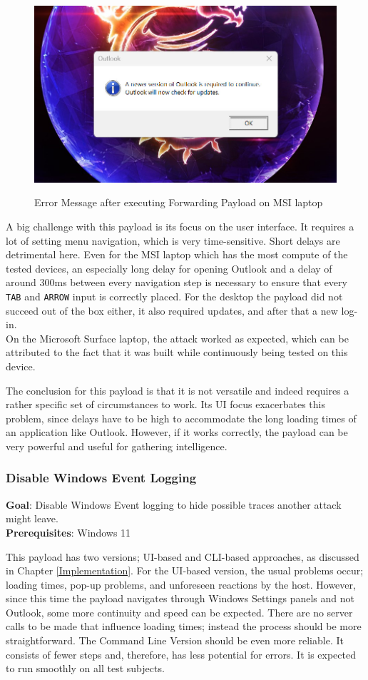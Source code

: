 \begin{figure}[H]
    \centering
    \includegraphics[width=0.5\linewidth]{visuals/outlook_requires_update.jpeg}
    \caption{Error Message after executing Forwarding Payload on MSI laptop}
    \label{fig:builtInTeensy}
    \cite{farhiMalboardNovelUser2019}
\end{figure}


A big challenge with this payload is its focus on the user interface. It requires a lot of setting menu navigation, which is very time-sensitive. Short delays are detrimental here. Even for the MSI laptop which has the most compute of the tested devices, an especially long delay for opening Outlook and a delay of around 300ms between every navigation step is necessary to ensure that every \verb|TAB| and \verb|ARROW| input is correctly placed.  For the desktop the payload did not succeed out of the box either, it also required updates, and after that a new log-in. \\
On the Microsoft Surface laptop, the attack worked as expected, which can be attributed to the fact that it was built while continuously being tested on this device.

The conclusion for this payload is that it is not versatile and indeed requires a rather specific set of circumstances to work. Its UI focus exacerbates this problem, since delays have to be high to accommodate the long loading times of an application like Outlook. However, if it works correctly, the payload can be very powerful and useful for gathering intelligence. 


\subsubsection{Disable Windows Event Logging}

\textbf{Goal}: Disable Windows Event logging to hide possible traces another attack might leave. \\
\textbf{Prerequisites}: Windows 11

This payload has two versions; UI-based and CLI-based approaches, as discussed in Chapter \ref{Implementation}. For the UI-based version, the usual problems occur; loading times, pop-up problems, and unforeseen reactions by the host. However, since this time the payload navigates through Windows Settings panels and not Outlook, some more continuity and speed can be expected. There are no server calls to be made that influence loading times; instead the process should be more straightforward. 
The Command Line Version should be even more reliable. It consists of fewer steps and, therefore, has less potential for errors. It is expected to run smoothly on all test subjects.

